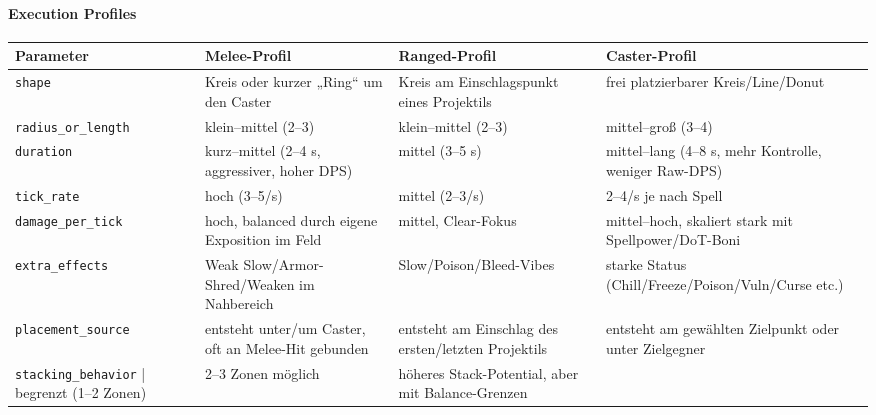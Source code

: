 \paragraph{Execution Profiles}{}
\scriptsize %
\begin{tabular}{p{3cm} | p{4cm} | p{4cm} | p{4cm}}
	Parameter           & Melee-Profil                                           & Ranged-Profil                                                 & Caster-Profil                                                          \\
	\hline
	\texttt{shape}             & Kreis oder kurzer „Ring“ um den Caster                & Kreis am Einschlagspunkt eines Projektils                     & frei platzierbarer Kreis/Line/Donut                                   \\
	\texttt{radius\_or\_length}  & klein–mittel (2–3)                                    & klein–mittel (2–3)                                            & mittel–groß (3–4)                                                     \\
	\texttt{duration}          & kurz–mittel (2–4 s, aggressiver, hoher DPS)           & mittel (3–5 s)                                                & mittel–lang (4–8 s, mehr Kontrolle, weniger Raw-DPS)                 \\
	\texttt{tick\_rate}         & hoch (3–5/s)                                          & mittel (2–3/s)                                                & 2–4/s je nach Spell                                                   \\
	\texttt{damage\_per\_tick}   & hoch, balanced durch eigene Exposition im Feld        & mittel, Clear-Fokus                                           & mittel–hoch, skaliert stark mit Spellpower/DoT-Boni                  \\
	\texttt{extra\_effects}     & Weak Slow/Armor-Shred/Weaken im Nahbereich            & Slow/Poison/Bleed-Vibes                                       & starke Status (Chill/Freeze/Poison/Vuln/Curse etc.)                  \\
	\texttt{placement\_source}  & entsteht unter/um Caster, oft an Melee-Hit gebunden   & entsteht am Einschlag des ersten/letzten Projektils          & entsteht am gewählten Zielpunkt oder unter Zielgegner                \\
	\texttt{stacking\_behavior} | begrenzt (1–2 Zonen)                                  & 2–3 Zonen möglich                                             & höheres Stack-Potential, aber mit Balance-Grenzen                    \\
	\hline
\end{tabular}
\normalsize
